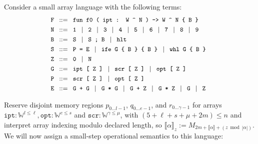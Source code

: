 \documentclass[sigplan,nonacm]{acmart}\settopmatter{printfolios=false,printccs=false,printacmref=false}
\begin{document}
Consider a small array language with the following terms:
\[\small
  \begin{aligned}
    \texttt{F } &::= \texttt{ fun f0 ( ipt : W \char`\^\ N ) -> W \char`\^\ N \{ B \} } \\
    \texttt{N } &::= \texttt{ 1 } \mid \texttt{ 2 }  \mid \texttt{ 3 } \mid \texttt{ 4 } \mid \texttt{ 5 } \mid \texttt{ 6 } \mid \texttt{ 7 } \mid \texttt{ 8 } \mid \texttt{ 9 } \\
    \texttt{B } &::= \texttt{ S } \mid \texttt{ S ; B } \mid \texttt{ hlt} \\
    \texttt{S } &::= \texttt{ P = E } \mid \texttt{ ife G \{ B \} \{ B \} } \mid \texttt{ whl G \{ B \}}\\
    \texttt{Z } &::= \texttt{ 0 } \mid \texttt{ N}\\
    \texttt{G } &::= \texttt{ ipt [ Z ] } \mid \texttt{ scr [ Z ] } \mid \texttt{ opt [ Z ]} \\
    \texttt{P } &::= \texttt{ scr [ Z ] } \mid \texttt{ opt [ Z ]} \\
    \texttt{E } &::= \texttt{ G + G } \mid \texttt{ G * G } \mid \texttt{ G + Z } \mid \texttt{ G * Z } \mid \texttt{ G } \mid \texttt{ Z }\\
  \end{aligned}
\]

\noindent Reserve disjoint memory regions \(p_{0\dots l-1}\), \(q_{0\dots e-1}\), and \(r_{0\dots \gamma-1}\) for arrays $\texttt{ipt}: \mathbb{W}^{l \le \ell}, \texttt{opt}: \mathbb{W}^{e \le s}$ and $\texttt{scr}: \mathbb{W}^{\gamma \le \mu}$, with $(5+\ell+s+\mu+2m)\le n$ and interpret array indexing modulo declared length, so \(\llbracket\alpha\rrbracket_z := M_{2m + \llbracket\alpha\rrbracket + (z\bmod |\alpha|)}\). We will now assign a small-step operational semantics to this language:
\end{document}
